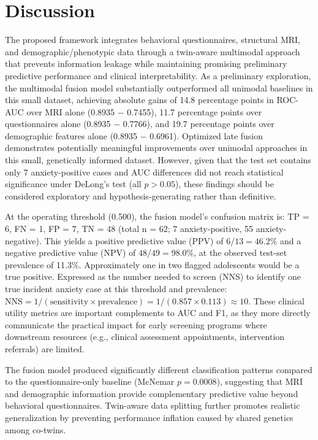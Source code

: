 \documentclass[10pt,letterpaper]{article}
\begin{document}
\section*{Discussion}
The proposed framework integrates behavioral questionnaires, structural MRI, and demographic/phenotypic data through a twin-aware multimodal approach that prevents information leakage while maintaining promising preliminary predictive performance and clinical interpretability. As a preliminary exploration, the multimodal fusion model substantially outperformed all unimodal baselines in this small dataset, achieving absolute gains of 14.8 percentage points in ROC-AUC over MRI alone (0.8935 $-$ 0.7455), 11.7 percentage points over questionnaires alone (0.8935 $-$ 0.7766), and 19.7 percentage points over demographic features alone (0.8935 $-$ 0.6961). Optimized late fusion demonstrates potentially meaningful improvements over
unimodal approaches in this small, genetically informed dataset. However, given that the test set contains only 7 anxiety-positive cases and AUC differences did not reach statistical significance under DeLong's test (all $p > 0.05$), these findings should be considered exploratory and hypothesis-generating rather than definitive.

At the operating threshold (0.500), the fusion model's confusion matrix is: TP = 6, FN = 1, FP = 7, TN = 48 (total n = 62; 7 anxiety-positive, 55 anxiety-negative). This yields a positive predictive value (PPV) of $6/13 = 46.2\%$ and a negative predictive value (NPV) of $48/49 = 98.0\%$, at the observed test-set prevalence of 11.3\%. Approximately one in two flagged adolescents would be a true positive. Expressed as the number needed to screen (NNS) to identify one true incident anxiety case at this threshold and prevalence: $\text{NNS} = 1/(\text{sensitivity} \times \text{prevalence}) = 1/(0.857 \times 0.113) \approx 10$. These clinical utility metrics are important complements to AUC and F1, as they more directly communicate the practical impact for early screening programs where downstream resources (e.g., clinical assessment appointments, intervention referrals) are limited.

The fusion model produced significantly different classification patterns compared to the questionnaire-only baseline (McNemar $p = 0.0008$), suggesting that MRI and demographic information provide complementary predictive value beyond behavioral questionnaires.
Twin-aware data splitting further promotes realistic generalization by
preventing performance inflation caused by shared genetics among co-twins.
\end{document}
